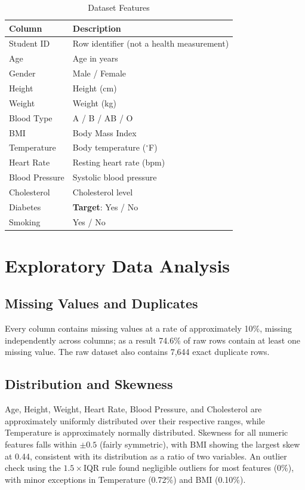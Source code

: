 \documentclass[journal]{IEEEtran}
\begin{document}
\begin{table}[!ht]
\centering
\caption{Dataset Features}
\label{tab:features}
\begin{tabular}{@{}ll@{}}
\toprule
\textbf{Column} & \textbf{Description} \\
\midrule
Student ID & Row identifier (not a health measurement) \\
Age & Age in years \\
Gender & Male / Female \\
Height & Height (cm) \\
Weight & Weight (kg) \\
Blood Type & A / B / AB / O \\
BMI & Body Mass Index \\
Temperature & Body temperature ($^{\circ}$F) \\
Heart Rate & Resting heart rate (bpm) \\
Blood Pressure & Systolic blood pressure \\
Cholesterol & Cholesterol level \\
Diabetes & \textbf{Target}: Yes / No \\
Smoking & Yes / No \\
\bottomrule
\end{tabular}
\end{table}

\section{Exploratory Data Analysis}

\subsection{Missing Values and Duplicates}
Every column contains missing values at a rate of approximately 10\%, missing independently across columns; as a result 74.6\% of raw rows contain at least one missing value. The raw dataset also contains 7{,}644 exact duplicate rows.

\subsection{Distribution and Skewness}
Age, Height, Weight, Heart Rate, Blood Pressure, and Cholesterol are approximately uniformly distributed over their respective ranges, while Temperature is approximately normally distributed. Skewness for all numeric features falls within $\pm 0.5$ (fairly symmetric), with BMI showing the largest skew at 0.44, consistent with its distribution as a ratio of two variables. An outlier check using the $1.5\times$IQR rule found negligible outliers for most features (0\%), with minor exceptions in Temperature (0.72\%) and BMI (0.10\%).
\end{document}
